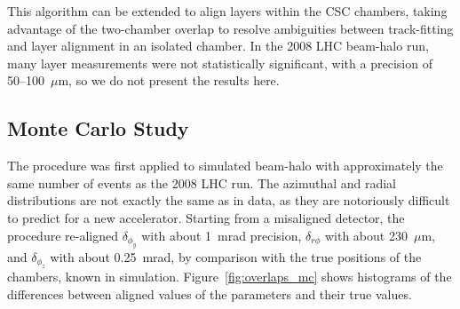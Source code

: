 This algorithm can be extended to align layers within the CSC
chambers, taking advantage of the two-chamber overlap to resolve
ambiguities between track-fitting and layer alignment in an isolated
chamber.  In the 2008 LHC beam-halo run, many layer measurements were
not statistically significant, with a precision of 50--100~$\mu$m, so
we do not present the results here.

\subsection{Monte Carlo Study}

The procedure was first applied to simulated beam-halo with
approximately the same number of events as the 2008 LHC run.  The
azimuthal and radial distributions are not exactly the same as in
data, as they are notoriously difficult to predict for a new
accelerator.  Starting from a misaligned detector, the procedure
re-aligned $\delta_{\phi_y}$ with about 1~mrad precision,
$\delta_{r\phi}$ with about 230~$\mu$m, and $\delta_{\phi_z}$ with
about 0.25~mrad, by comparison with the true positions of the
chambers, known in simulation.  Figure~\ref{fig:overlaps_mc}
shows histograms of the differences between aligned values of the
parameters and their true values.

